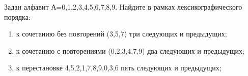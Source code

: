 \question 
Задан алфавит А={0,1,2,3,4,5,6,7,8,9}. Найдите в рамках лексикографического порядка:
\begin{enumerate}
\item  к сочетанию без повторений (3,5,7) три следующих и предыдущих;
\item  к сочетанию с повторениями (0,2,3,4,7,9) два следующих и предыдущих;
\item  к перестановке 4,5,2,1,7,8,9,0,3,6 пять следующих и предыдущих;
\end{enumerate}

